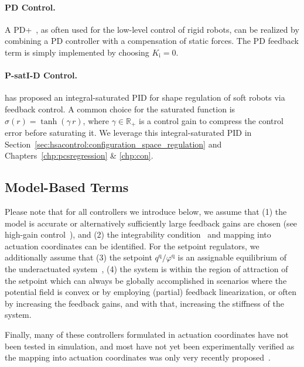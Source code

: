 \paragraph{PD Control.} A PD+~\citep{kelly1997pd}, as often used for the low-level control of rigid robots, can be realized by combining a PD controller with a compensation of static forces. The PD feedback term is simply implemented by choosing $K_\mathrm{i} = 0$.

\paragraph{P-satI-D Control.} \citet{pustina2022p} has proposed an integral-saturated PID for shape regulation of soft robots via feedback control. A common choice for the saturated function is $\sigma(r) = \tanh(\gamma \, r)$, where $\gamma \in \mathbb{R}_+$ is a control gain to compress the control error before saturating it. We leverage this integral-saturated PID in Section~\ref{sec:hsacontrol:configuration_space_regulation} and Chapters~\ref{chp:pcsregression} \& \ref{chp:con}.

\subsection{Model-Based Terms}\label{sub:background:model_based_control:feedforward_terms}
Please note that for all controllers we introduce below, we assume that (1) the model is accurate or alternatively sufficiently large feedback gains are chosen (see high-gain control~\citep{marino1985high}), and (2) the integrability condition~\citep{pustina2024input} and mapping into actuation coordinates can be identified.
For the setpoint regulators, we additionally assume that (3) the setpoint $q^\mathrm{q}/\varphi^\mathrm{q}$ is an assignable equilibrium of the underactuated system~\citep{pustina2022feedback}, (4) the system is within the region of attraction of the setpoint which can always be globally accomplished in scenarios where the potential field is convex or by employing (partial) feedback linearization, or often by increasing the feedback gains, and with that, increasing the stiffness of the system. 

Finally, many of these controllers formulated in actuation coordinates have not been tested in simulation, and most have not yet been experimentally verified as the mapping into actuation coordinates was only very recently proposed~\citep{pustina2024input}.

